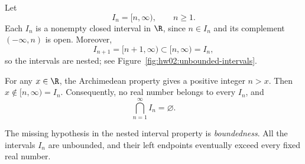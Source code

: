 Let
\[
  I_n=[n,\infty),\qquad n\geq1.
\]
Each $I_n$ is a nonempty closed interval in $\R$, since $n\in I_n$
and its complement $(-\infty,n)$ is open. Moreover,
\[
  I_{n+1}=[n+1,\infty)\subset[n,\infty)=I_n,
\]
so the intervals are nested; see
Figure~\ref{fig:hw02:unbounded-intervals}.
\begin{marginfigure}
  \centering
  
  \caption{Each ray $[n,\infty)$ includes its finite left endpoint
    and extends indefinitely to the right.}
  \label{fig:hw02:unbounded-intervals}
\end{marginfigure}

For any $x\in\R$, the Archimedean property gives a positive
integer $n>x$.
Then $x\notin[n,\infty)=I_n$. Consequently, no real number belongs
to every $I_n$, and
\[
  \bigcap_{n=1}^{\infty}I_n=\varnothing.
\]

The missing hypothesis in the nested interval property is
\emph{boundedness}. All the intervals $I_n$ are unbounded, and
their left endpoints eventually exceed every fixed real number.
